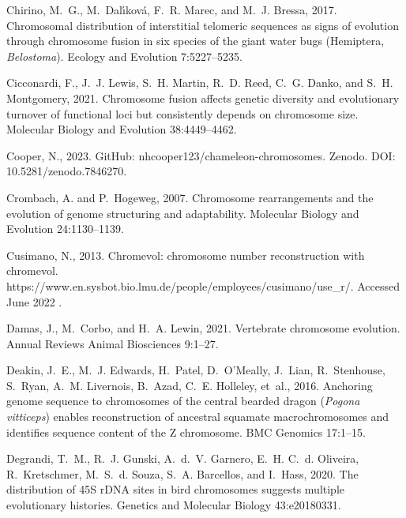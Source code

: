 \documentclass[a4paper, 12pt]{article}
\begin{document}
\begin{thebibliography}{73}
Chirino, M.~G., M.~Dal{\'\i}kov{\'a}, F.~R. Marec, and M.~J. Bressa, 2017.
\newblock Chromosomal distribution of interstitial telomeric sequences as signs
  of evolution through chromosome fusion in six species of the giant water bugs
  ({H}emiptera, \textit{Belostoma}).
\newblock Ecology and Evolution 7:5227--5235.

Cicconardi, F., J.~J. Lewis, S.~H. Martin, R.~D. Reed, C.~G. Danko, and S.~H.
  Montgomery, 2021.
\newblock Chromosome fusion affects genetic diversity and evolutionary turnover
  of functional loci but consistently depends on chromosome size.
\newblock Molecular Biology and Evolution 38:4449--4462.

Cooper, N., 2023.
\newblock GitHub: nhcooper123/chameleon-chromosomes. Zenodo. DOI: 10.5281/zenodo.7846270.

Crombach, A. and P.~Hogeweg, 2007.
\newblock Chromosome rearrangements and the evolution of genome structuring and
  adaptability.
\newblock Molecular Biology and Evolution 24:1130--1139.

Cusimano, N., 2013.
\newblock Chromevol: chromosome number reconstruction with chromevol.
\newblock https://www.en.sysbot.bio.lmu.de/people/employees/cusimano/use\_r/.
  {A}ccessed {J}une 2022 .

Damas, J., M.~Corbo, and H.~A. Lewin, 2021.
\newblock Vertebrate chromosome evolution.
\newblock Annual Reviews Animal Biosciences 9:1--27.

Deakin, J.~E., M.~J. Edwards, H.~Patel, D.~O'Meally, J.~Lian, R.~Stenhouse,
  S.~Ryan, A.~M. Livernois, B.~Azad, C.~E. Holleley, et~al., 2016.
\newblock Anchoring genome sequence to chromosomes of the central bearded
  dragon (\textit{Pogona vitticeps}) enables reconstruction of ancestral
  squamate macrochromosomes and identifies sequence content of the {Z}
  chromosome.
\newblock BMC Genomics 17:1--15.

Degrandi, T.~M., R.~J. Gunski, A.~d.~V. Garnero, E.~H. C.~d. Oliveira,
  R.~Kretschmer, M.~S.~d. Souza, S.~A. Barcellos, and I.~Hass, 2020.
\newblock The distribution of 45{S} r{DNA} sites in bird chromosomes suggests
  multiple evolutionary histories.
\newblock Genetics and Molecular Biology 43:e20180331.


\end{thebibliography}
\end{document}

